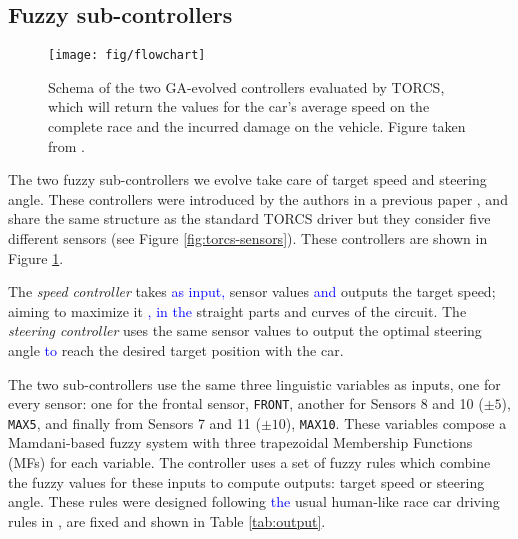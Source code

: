 \documentclass[10pt,journal,compsoc]{IEEEtran}
\begin{document}

\subsection{Fuzzy sub-controllers}
\label{subsec:fuzzy-controllers}

\begin{figure}[!ht]
  \begin{center}
    \texttt{[image: fig/flowchart]}
  \end{center}
  \caption{Schema of the two GA-evolved controllers evaluated by TORCS, which will
    return the values for the car's average speed on the complete race
    and the incurred damage on the vehicle. Figure taken from
    \cite{salem_evo18}.}
    \label{fig:ga}
\end{figure}
%
The two fuzzy sub-controllers we evolve take care of target speed and steering angle. These controllers were introduced by the authors in a previous paper \cite{salem_evo17}, and share the same structure as the standard TORCS driver but they consider five different sensors (see Figure \ref{fig:torcs-sensors}). These controllers are shown in Figure \ref{fig:ga}. 


The \textit{speed controller} takes \textcolor{blue}{as input,} sensor values \textcolor{blue}{and} outputs the target speed; aiming to maximize it \textcolor{blue}{, in the} straight parts and curves of the circuit. The \textit{steering controller} uses the same sensor values to output the optimal steering angle \textcolor{blue}{to} reach the desired target position with the car.

The two sub-controllers use the same three linguistic variables as
inputs, one for every sensor: one for the frontal sensor,
\texttt{FRONT}, another for Sensors 8 and 10 ($\pm 5$\textdegree),
\texttt{MAX5}, and finally from Sensors 7 and 11 ($\pm
10$\textdegree), \texttt{MAX10}. These variables compose a Mamdani-based fuzzy
system \cite{iancu2012} with three trapezoidal Membership Functions
(MFs) for each variable. The controller uses a set of fuzzy rules
which combine the fuzzy values for these inputs to compute outputs:
target speed or steering angle.
% 
These rules were designed following \textcolor{blue}{the} usual human-like race car driving
rules in \cite{salem_evo18}, are fixed and shown in Table \ref{tab:output}.
\end{document}
